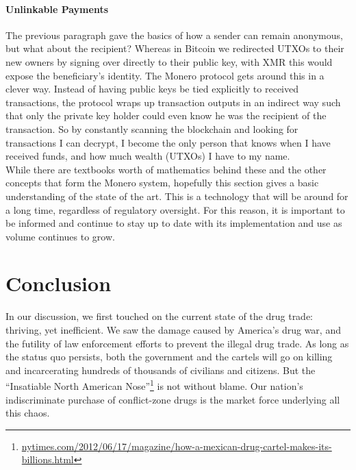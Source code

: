 \documentclass[12pt]{article}
\begin{document}
\paragraph{Unlinkable Payments} The previous paragraph gave the basics of how a sender can remain anonymous, but what about the recipient? Whereas in Bitcoin we redirected UTXOs to their new owners by signing over directly to their public key, with XMR this would expose the beneficiary's identity. The Monero protocol gets around this in a clever way. Instead of having public keys be tied explicitly to received transactions, the protocol wraps up transaction outputs in an indirect way such that only the private key holder could even know he was the recipient of the transaction. So by constantly scanning the blockchain and looking for transactions I can decrypt, I become the only person that knows when I have received funds, and how much wealth (UTXOs) I have to my name.%
\\

While there are textbooks worth of mathematics behind these and the other concepts that form the Monero system, hopefully this section gives a basic understanding of the state of the art. This is a technology that will be around for a long time, regardless of regulatory oversight. For this reason, it is important to be informed and continue to stay up to date with its implementation and use as volume continues to grow.


\clearpage




\section{Conclusion}

In our discussion, we first touched on the current state of the drug trade: thriving, yet inefficient. We saw the damage caused by America's drug war, and the futility of law enforcement efforts to prevent the illegal drug trade. As long as the status quo persists, both the government and the cartels will go on killing and incarcerating hundreds of thousands of civilians and citizens. But the ``Insatiable North American Nose''\footnote{\url{nytimes.com/2012/06/17/magazine/how-a-mexican-drug-cartel-makes-its-billions.html}} is not without blame. Our nation's indiscriminate purchase of conflict-zone drugs is the market force underlying all this chaos.
\\
\end{document}
